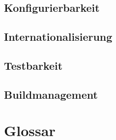 \documentclass[pdftex,12pt,a4paper]{article}
\begin{document}
\subsection{Konfigurierbarkeit}

\subsection{Internationalisierung}

\subsection{Testbarkeit}

\subsection{Buildmanagement}

\section{Glossar}
\end{document}
